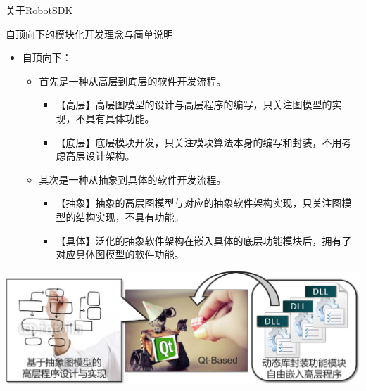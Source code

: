 \documentclass[9pt]{beamer}
\begin{document}
	\begin{frame}{关于RobotSDK}
		\begin{block}{自顶向下的模块化开发理念与简单说明}
			\begin{itemize}
				\item 自顶向下：
				\begin{itemize}
					\item<2-> 首先是一种从高层到底层的软件开发流程。
					\begin{itemize}
						\item 【高层】高层图模型的设计与高层程序的编写，只关注图模型的实现，不具有具体功能。
						\item 【底层】底层模块开发，只关注模块算法本身的编写和封装，不用考虑高层设计架构。
					\end{itemize}
					\item<3-> 其次是一种从抽象到具体的软件开发流程。
					\begin{itemize}
						\item 【抽象】抽象的高层图模型与对应的抽象软件架构实现，只关注图模型的结构实现，不具有功能。
						\item 【具体】泛化的抽象软件架构在嵌入具体的底层功能模块后，拥有了对应具体图模型的软件功能。
					\end{itemize}
				\end{itemize}
			\end{itemize}
		\end{block}
		\begin{center}
			\includegraphics[width=\textwidth]{./img/idea}
		\end{center}
	\end{frame}	
\end{document}
